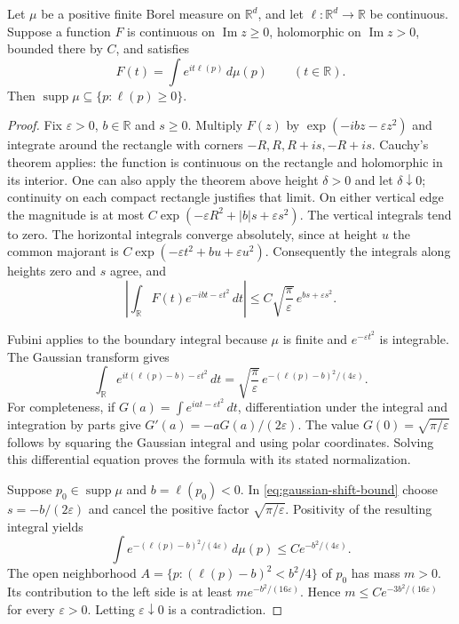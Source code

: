 \begin{lemma}\label{lem:paley-positive}
Let $\mu$ be a positive finite Borel measure on $\mathbb R^d$, and let
$\ell:\mathbb R^d\to\mathbb R$ be continuous. Suppose a function $F$ is
continuous on $\operatorname{Im}z\geq0$, holomorphic on
$\operatorname{Im}z>0$, bounded there by $C$, and satisfies
\[
 F(t)=\int e^{it\ell(p)}\,d\mu(p)\qquad(t\in\mathbb R).
\]
Then $\operatorname{supp}\mu\subseteq\{p:\ell(p)\geq0\}$.
\end{lemma}
\begin{proof}
Fix $\varepsilon>0$, $b\in\mathbb R$ and $s\geq0$. Multiply $F(z)$ by
$\exp(-ibz-\varepsilon z^2)$ and integrate around the rectangle with
corners $-R,R,R+is,-R+is$. Cauchy's theorem applies: the function is
continuous on the rectangle and holomorphic in its interior. One can
also apply the theorem above height $\delta>0$ and let $\delta\downarrow0$;
continuity on each compact rectangle justifies that limit.
On either vertical edge the magnitude is at most
$C\exp(-\varepsilon R^2+|b|s+\varepsilon s^2)$.
The vertical integrals tend to zero. The horizontal integrals converge
absolutely, since at height $u$ the common majorant is
$C\exp(-\varepsilon t^2+bu+\varepsilon u^2)$.
Consequently the integrals along heights zero and $s$ agree, and
\begin{equation}\label{eq:gaussian-shift-bound}
 \left|\int_{\mathbb R}F(t)e^{-ibt-\varepsilon t^2}\,dt\right|
 \leq C\sqrt{\frac\pi\varepsilon}\,
                e^{bs+\varepsilon s^2}.
\end{equation}

Fubini applies to the boundary integral because $\mu$ is finite and
$e^{-\varepsilon t^2}$ is integrable. The Gaussian transform gives
\[
 \int_{\mathbb R}e^{it(\ell(p)-b)-\varepsilon t^2}\,dt
 =\sqrt{\frac\pi\varepsilon}\,
       e^{-(\ell(p)-b)^2/(4\varepsilon)}.
\]
For completeness, if $G(a)=\int e^{iat-\varepsilon t^2}\,dt$,
differentiation under the integral and integration by parts give
$G'(a)=-aG(a)/(2\varepsilon)$. The value
$G(0)=\sqrt{\pi/\varepsilon}$ follows by squaring the Gaussian integral
and using polar coordinates. Solving this differential equation proves
the formula with its stated normalization.

Suppose $p_0\in\operatorname{supp}\mu$ and $b=\ell(p_0)<0$.
In \eqref{eq:gaussian-shift-bound} choose $s=-b/(2\varepsilon)$ and
cancel the positive factor $\sqrt{\pi/\varepsilon}$. Positivity of the
resulting integral yields
\[
 \int e^{-(\ell(p)-b)^2/(4\varepsilon)}\,d\mu(p)
 \leq C e^{-b^2/(4\varepsilon)}.
\]
The open neighborhood
$A=\{p:(\ell(p)-b)^2<b^2/4\}$ of $p_0$ has mass $m>0$.
Its contribution to the left side is at least
$m e^{-b^2/(16\varepsilon)}$. Hence
$m\leq C e^{-3b^2/(16\varepsilon)}$ for every $\varepsilon>0$.
Letting $\varepsilon\downarrow0$ is a contradiction.
\end{proof}

